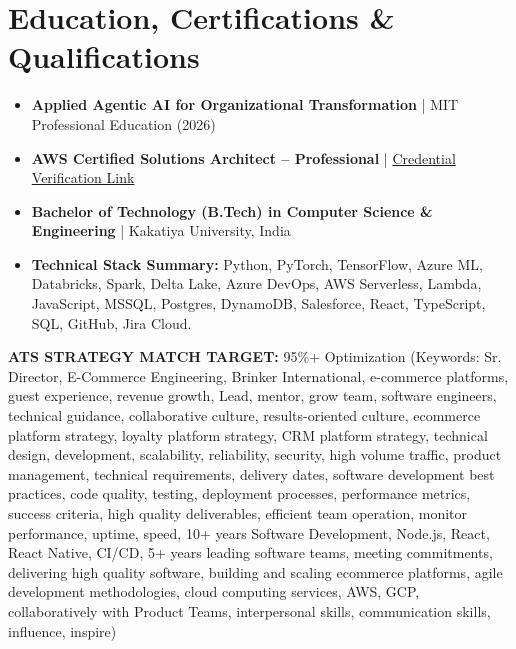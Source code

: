 \documentclass[9pt, letterpaper]{extarticle}
\begin{document}
\section{Education, Certifications \& Qualifications}
\begin{itemize}
    \item \textbf{Applied Agentic AI for Organizational Transformation} | MIT Professional Education (2026)
    \item \textbf{AWS Certified Solutions Architect -- Professional} | \href{https://www.credly.com/badges/7ef67d8d-67f2-4036-a8bf-8bbe73098a1f/linked_in?t=teze8g}{Credential Verification Link}
    \item \textbf{Bachelor of Technology (B.Tech) in Computer Science \& Engineering} | Kakatiya University, India
    \item \textbf{Technical Stack Summary:} Python, PyTorch, TensorFlow, Azure ML, Databricks, Spark, Delta Lake, Azure DevOps, AWS Serverless, Lambda, JavaScript, MSSQL, Postgres, DynamoDB, Salesforce, React, TypeScript, SQL, GitHub, Jira Cloud.
\end{itemize}

\footnotesize \textbf{ATS STRATEGY MATCH TARGET:} 95\%+ Optimization (Keywords: Sr. Director, E-Commerce Engineering, Brinker International, e-commerce platforms, guest experience, revenue growth, Lead, mentor, grow team, software engineers, technical guidance, collaborative culture, results-oriented culture, ecommerce platform strategy, loyalty platform strategy, CRM platform strategy, technical design, development, scalability, reliability, security, high volume traffic, product management, technical requirements, delivery dates, software development best practices, code quality, testing, deployment processes, performance metrics, success criteria, high quality deliverables, efficient team operation, monitor performance, uptime, speed, 10+ years Software Development, Node.js, React, React Native, CI/CD, 5+ years leading software teams, meeting commitments, delivering high quality software, building and scaling ecommerce platforms, agile development methodologies, cloud computing services, AWS, GCP, collaboratively with Product Teams, interpersonal skills, communication skills, influence, inspire)
\end{document}
